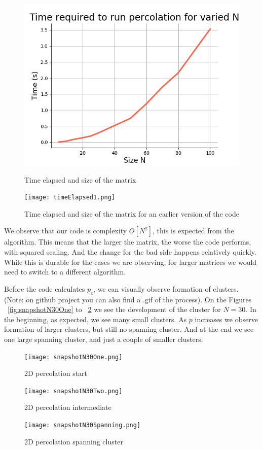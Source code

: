 \documentclass[12pt]{article}
\begin{document}
\begin{figure}[!htb]
  \includegraphics[width=\linewidth]{timeElapsedSPEEDY.png}
  \caption{Time elapsed and size of the matrix}\label{fig:timeElapsed}
\endminipage\hfill
{}
  \texttt{[image: timeElapsed1.png]}
  \caption{Time elapsed and size of the matrix for an earlier version of the code}\label{fig:timeElapsedOLD}
\endminipage\hfill
\end{figure}

We observe that our code is complexity $O[N^2]$, this is expected from the algorithm. This means that the larger the matrix, the worse the code performs, with squared scaling. And the change for the bad side happens relatively quickly. While this is durable for the cases we are observing, for larger matrices we would need to switch to a different algorithm.

Before the code calculates $p_c$, we can visually observe formation of clusters. (Note: on github project you can also find a .gif of the process). On the Figures ~\ref{fig:snapshotN30One} to ~\ref{fig:snapshotN30Spanning} we see the development of the cluster for $N=30$. In the beginning, as expected, we see many small clusters. As $p$ increases we observe formation of larger clusters, but still no spanning cluster. And at the end we see one large spanning cluster, and just a couple of smaller clusters.

\begin{figure}[!htb]
  \texttt{[image: snapshotN30One.png]}
  \caption{2D percolation start}\label{fig:snapshotN30One}
\endminipage\hfill
{}
  \texttt{[image: snapshotN30Two.png]}
  \caption{2D percolation intermediate}\label{fig:snapshotN30Two}
\endminipage\hfill
{}
  \texttt{[image: snapshotN30Spanning.png]}
  \caption{2D percolation spanning cluster}\label{fig:snapshotN30Spanning}
\endminipage\hfill
\end{figure}
\end{document}
